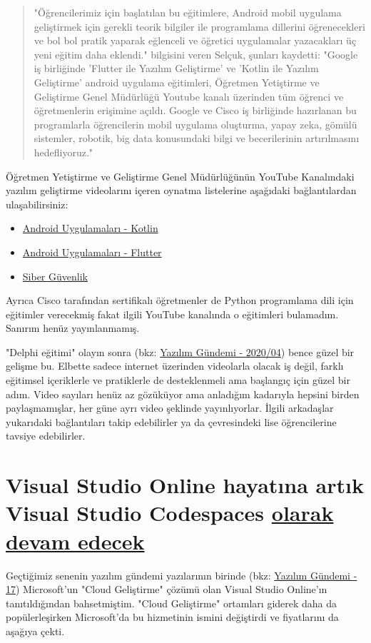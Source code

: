 \documentclass[11pt]{article}
\begin{document}
\begin{quote}
"Öğrencilerimiz için başlatılan bu eğitimlere, Android mobil uygulama
geliştirmek için gerekli teorik bilgiler ile programlama dillerini
öğrenecekleri ve bol bol pratik yaparak eğlenceli ve öğretici uygulamalar
yazacakları üç yeni eğitim daha eklendi." bilgisini veren Selçuk, şunları
kaydetti: "Google iş birliğinde 'Flutter ile Yazılım Geliştirme' ve 'Kotlin
ile Yazılım Geliştirme' android uygulama eğitimleri, Öğretmen Yetiştirme ve
Geliştirme Genel Müdürlüğü Youtube kanalı üzerinden tüm öğrenci ve
öğretmenlerin erişimine açıldı. Google ve Cisco iş birliğinde hazırlanan bu
programlarla öğrencilerin mobil uygulama oluşturma, yapay zeka, gömülü
sistemler, robotik, big data konusundaki bilgi ve becerilerinin artırılmasını
hedefliyoruz."
\end{quote}

Öğretmen Yetiştirme ve Geliştirme Genel Müdürlüğünün YouTube Kanalındaki
yazılım geliştirme videolarını içeren oynatma listelerine aşağıdaki
bağlantılardan ulaşabilirsiniz:
\begin{itemize}
\item \href{https://www.youtube.com/playlist?list=PLVR0OGiP4Ky\_x69HfEbrhlpbGUvpQ3\_JE}{Android Uygulamaları - Kotlin}
\item \href{https://www.youtube.com/playlist?list=PLVR0OGiP4Ky9VQUSthzimF-BqeBp1YWcU}{Android Uygulamaları - Flutter}
\item \href{https://www.youtube.com/playlist?list=PLVR0OGiP4Ky9RKQvi\_ILDN-lmmWxldoa0}{Siber Güvenlik}
\end{itemize}

Ayrıca Cisco tarafından sertifikalı öğretmenler de Python programlama dili
için eğitimler verecekmiş fakat ilgili YouTube kanalında o eğitimleri
bulamadım. Sanırım henüz yayınlanmamış.

"Delphi eğitimi" olayın sonra (bkz: \href{../04/yazilim-gundemi-2020-04.pdf}{Yazılım Gündemi - 2020/04}) bence güzel bir
gelişme bu. Elbette sadece internet üzerinden videolarla olacak iş değil,
farklı eğitimsel içeriklerle ve pratiklerle de desteklenmeli ama başlangıç
için güzel bir adım. Video sayıları henüz az gözüküyor ama anladığım kadarıyla
hepsini birden paylaşmamışlar, her güne ayrı video şeklinde yayınlıyorlar.
İlgili arkadaşlar yukarıdaki bağlantıları takip edebilirler ya da çevresindeki
lise öğrencilerine tavsiye edebilirler.
\section{Visual Studio Online hayatına artık Visual Studio Codespaces \href{https://devblogs.microsoft.com/visualstudio/introducing-visual-studio-codespaces/\#lower-price}{olarak devam edecek}}
\label{sec:org46e4511}
Geçtiğimiz senenin yazılım gündemi yazılarının birinde (bkz: \href{../../2019/yazilim-gundemi-17.pdf}{Yazılım Gündemi -
17}) Microsoft'un "Cloud Geliştirme" çözümü olan Visual Studio Online'ın
tanıtıldığından bahsetmiştim. "Cloud Geliştirme" ortamları giderek daha da
popülerleşirken Microsoft'da bu hizmetinin ismini değiştirdi ve fiyatlarını da
aşağıya çekti.
\end{document}
